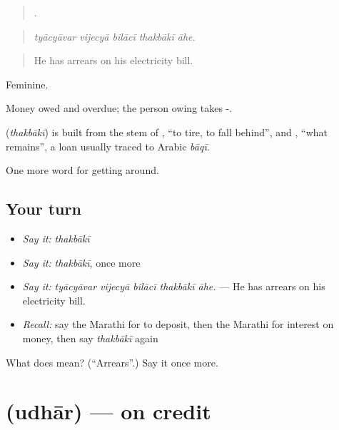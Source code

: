 \begin{quote}
    .
\end{quote}

\begin{quote}
\emph{tyācyāvar vijecyā bilācī thakbākī āhe.}
\end{quote}

\begin{quote}
He has arrears on his electricity bill.
\end{quote}

Feminine.

Money owed and overdue; the person owing takes -.

\begin{cousinweb}
\textbf{} (\emph{thakbākī}) is built from the stem of \textbf{}, \textquotedblleft{}to tire, to fall behind\textquotedblright{}, and \textbf{}, \textquotedblleft{}what remains\textquotedblright{}, a loan usually traced to Arabic \emph{bāqī}.
\end{cousinweb}

\begin{grammarlens}[title={What you've built}]
One more word for getting around.
\end{grammarlens}

\subsection*{Your turn}
\begin{itemize}
\raggedright
  \item \emph{Say it:} \emph{thakbākī}
  \item \emph{Say it:} \emph{thakbākī}, once more
  \item \emph{Say it:} \emph{tyācyāvar vijecyā bilācī thakbākī āhe.} — He has arrears on his electricity bill.
  \item \emph{Recall:} say the Marathi for to deposit, then the Marathi for interest on money, then say \emph{thakbākī} again
\end{itemize}

\begin{tcolorbox}[breakable,colback=teal!4,colframe=teal!35!black,title={Before you move on}]
What does  mean? (\textquotedblleft{}Arrears\textquotedblright{}.) Say it once more.
\end{tcolorbox}
\section[\texorpdfstring{\mr{उधार} (udhār)}{उधार (udhār)}]{ (udhār) — on credit}

